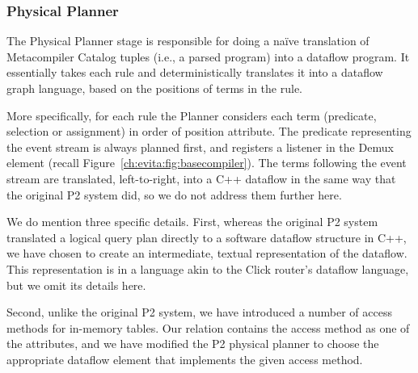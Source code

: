 \subsubsection{Physical Planner}
\label{ch:evita:sec:planner}

The Physical Planner stage is responsible for doing a na\"{i}ve translation of
Metacompiler Catalog tuples (i.e., a parsed \OVERLOG program) into a dataflow
program.  It essentially takes each rule and deterministically translates it
into a dataflow graph language, based on the positions of terms in the rule.

More specifically, for each rule the Planner considers each term (predicate,
selection or assignment) in order of position attribute.  The predicate
representing the event stream is always planned first, and registers a listener
in the Demux element (recall Figure~\ref{ch:evita:fig:basecompiler}).  The
terms following the event stream are translated, left-to-right, into a C++
dataflow in the same way that the original P2 system did, so we do not address
them further here.

We do mention three specific details.  First, whereas the original P2 system
translated a logical query plan directly to a software dataflow structure in
C++, we have chosen to create an intermediate, textual representation of the
dataflow.  This representation is in a language akin to the Click router's
dataflow language, but we omit its details here.

Second, unlike the original P2 system, we have introduced a number of access
methods for in-memory tables.  Our  relation contains the access
method as one of the attributes, and we have modified the P2 physical planner
to choose the appropriate dataflow element that implements the given access
method.


